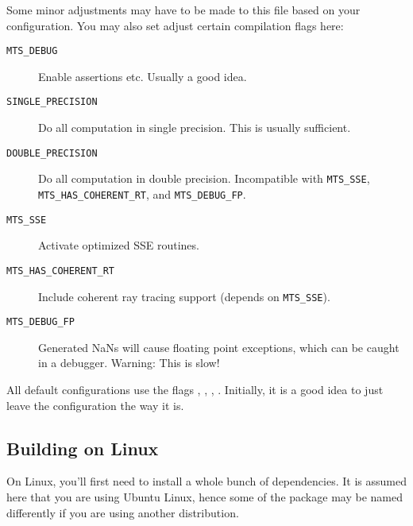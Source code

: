 Some minor adjustments may have to be made to this file based on your configuration. 
You may also set adjust certain compilation flags here:
\begin{description}
\item[\texttt{MTS\_DEBUG}] Enable assertions etc. Usually a good idea.
\item[\texttt{SINGLE\_PRECISION}] Do all computation in single precision. This is usually sufficient.
\item[\texttt{DOUBLE\_PRECISION}] Do all computation in double precision. Incompatible with
\texttt{MTS\_SSE}, \texttt{MTS\_HAS\_COHERENT\_RT}, and \texttt{MTS\_DEBUG\_FP}.
\item[\texttt{MTS\_SSE}]Activate optimized SSE routines.
\item[\texttt{MTS\_HAS\_COHERENT\_RT}]Include coherent ray tracing support (depends on \texttt{MTS\_SSE}).
\item[\texttt{MTS\_DEBUG\_FP}]Generated NaNs will cause floating point exceptions, which can be caught in a debugger. Warning: This is slow!
\end{description}
All default configurations use the flags , , , .
Initially, it is a good idea to just leave the configuration the way it is.

\subsection{Building on Linux}
On Linux, you'll first need to install a whole bunch of dependencies. It is assumed here
that you are using Ubuntu Linux, hence some of the package may be named differently if you are 
using another distribution.

